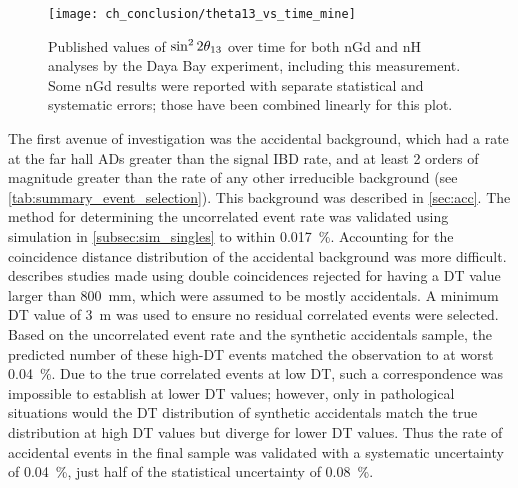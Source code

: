 \begin{figure}
    \centering
    \texttt{[image: ch\_conclusion/theta13\_vs\_time\_mine]}
    \caption[This measurement compared to earlier results]{
        Published values of $\sin^{2}2\theta_{13}$ over time
        for both nGd and nH analyses by the Daya Bay experiment,
        including this measurement.
        Some nGd results were reported with separate statistical
        and systematic errors;
        those have been combined linearly for this plot.
    }
    \label{fig:theta13_vs_t_mine}
\end{figure}

The first avenue of investigation was the accidental background,
which had a rate at the far hall ADs greater than the signal IBD rate,
and at least 2 orders of magnitude greater than the rate
of any other irreducible background (see \cref{tab:summary_event_selection}).
This background was described in \cref{sec:acc}.
The method for determining the uncorrelated event rate
was validated using simulation in \cref{subsec:sim_singles}
to within \SI{0.017}{\percent}.
Accounting for the coincidence distance distribution of the accidental background
was more difficult.
 describes studies made using double coincidences
rejected for having a DT value larger than \SI{800}{\mm},
which were assumed to be mostly accidentals.
A minimum DT value of \SI{3}{\m} was used to ensure no residual correlated events
were selected.
Based on the uncorrelated event rate and the synthetic accidentals sample,
the predicted number of these high-DT events matched the observation
to at worst \SI{0.04}{\percent}.
Due to the true correlated events at low DT, such a correspondence
was impossible to establish at lower DT values;
however, only in pathological situations
would the DT distribution of synthetic accidentals match the true distribution
at high DT values but diverge for lower DT values.
Thus the rate of accidental events in the final sample
was validated with a systematic uncertainty of \SI{0.04}{\percent},
just half of the statistical uncertainty of \SI{0.08}{\percent}.

